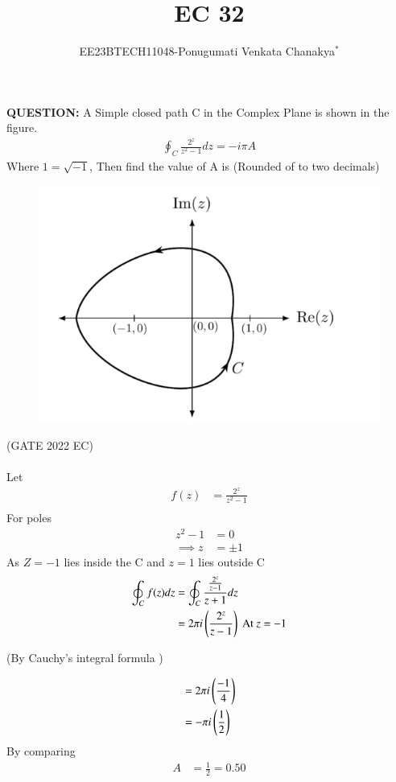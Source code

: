 \documentclass[journal,12pt,twocolumn]{IEEEtran}
\theoremstyle{remark}
\begin{document}
 
 \vspace{3cm}
 \title{\textbf{EC 32}}
 \author{EE23BTECH11048-Ponugumati Venkata Chanakya$^{*}$%
 }
 \maketitle

 \bigskip
 \renewcommand{\thefigure}{\theenumi}
 \renewcommand{\thetable}{\theenumi}
 \textbf{QUESTION:}
 A Simple closed path C in the Complex Plane is shown in the figure.
 \begin{align*}
        \oint_C \frac{2^z}{z^2-1}dz=-i\pi A
 \end{align*}
 Where $1=\sqrt{-1}$, Then find the value of A is \underline{ }(Rounded of to two decimals)
\begin{figure}[h!]
    \centering
    \includegraphics[width = \columnwidth]{figs/fig1.png}
\end{figure}
\hfill{(GATE 2022 EC)}\\
\solution \\

 Let\\
 \begin{align*}
 f(z)&=\frac{2^z}{z^2-1}\\
 \end{align*}
 For poles
 \begin{align}
     z^2-1&=0\\
    \implies z&=\pm1
 \end{align}
 As $Z=-1$ lies inside the C  and $z=1$ lies outside C
 \begin{align}
      \oint_C f(z)dz&= \oint_C\frac{\frac{2^z}{z-1}}{z+1}dz\\
      &=2\pi i\left(\frac{2^z}{z-1}\right) \text{ At }z=-1
      \end{align}
\begin{center}
    (By Cauchy's integral formula )
\end{center}
      \begin{align}
      &=2\pi i\left(\frac{-1}{4}\right)\\
      &=-\pi i\left(\frac{1}{2}\right)
 \end{align}
 By comparing\\
 \begin{align}
 A&=\frac{1}{2}=0.50
 \end{align}
 
\end{document}
